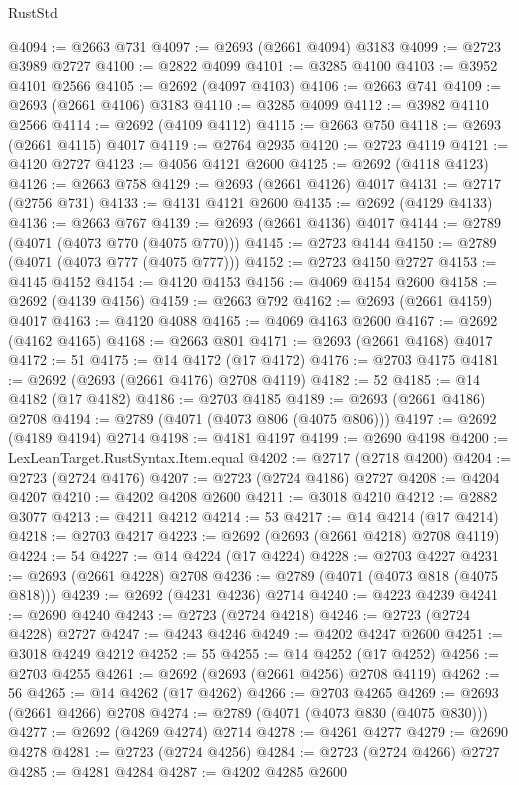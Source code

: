 \begin{lexlean}{RustStd}
\begin{coremodule}
@4094 := @2663 @731
@4097 := @2693 (@2661 @4094) @3183
@4099 := @2723 @3989 @2727
@4100 := @2822 @4099
@4101 := @3285 @4100
@4103 := @3952 @4101 @2566
@4105 := @2692 (@4097 @4103)
@4106 := @2663 @741
@4109 := @2693 (@2661 @4106) @3183
@4110 := @3285 @4099
@4112 := @3982 @4110 @2566
@4114 := @2692 (@4109 @4112)
@4115 := @2663 @750
@4118 := @2693 (@2661 @4115) @4017
@4119 := @2764 @2935
@4120 := @2723 @4119
@4121 := @4120 @2727
@4123 := @4056 @4121 @2600
@4125 := @2692 (@4118 @4123)
@4126 := @2663 @758
@4129 := @2693 (@2661 @4126) @4017
@4131 := @2717 (@2756 @731)
@4133 := @4131 @4121 @2600
@4135 := @2692 (@4129 @4133)
@4136 := @2663 @767
@4139 := @2693 (@2661 @4136) @4017
@4144 := @2789 (@4071 (@4073 @770 (@4075 @770)))
@4145 := @2723 @4144
@4150 := @2789 (@4071 (@4073 @777 (@4075 @777)))
@4152 := @2723 @4150 @2727
@4153 := @4145 @4152
@4154 := @4120 @4153
@4156 := @4069 @4154 @2600
@4158 := @2692 (@4139 @4156)
@4159 := @2663 @792
@4162 := @2693 (@2661 @4159) @4017
@4163 := @4120 @4088
@4165 := @4069 @4163 @2600
@4167 := @2692 (@4162 @4165)
@4168 := @2663 @801
@4171 := @2693 (@2661 @4168) @4017
@4172 := 51
@4175 := @14 @4172 (@17 @4172)
@4176 := @2703 @4175
@4181 := @2692 (@2693 (@2661 @4176) @2708 @4119)
@4182 := 52
@4185 := @14 @4182 (@17 @4182)
@4186 := @2703 @4185
@4189 := @2693 (@2661 @4186) @2708
@4194 := @2789 (@4071 (@4073 @806 (@4075 @806)))
@4197 := @2692 (@4189 @4194) @2714
@4198 := @4181 @4197
@4199 := @2690 @4198
@4200 := LexLeanTarget.RustSyntax.Item.equal
@4202 := @2717 (@2718 @4200)
@4204 := @2723 (@2724 @4176)
@4207 := @2723 (@2724 @4186) @2727
@4208 := @4204 @4207
@4210 := @4202 @4208 @2600
@4211 := @3018 @4210
@4212 := @2882 @3077
@4213 := @4211 @4212
@4214 := 53
@4217 := @14 @4214 (@17 @4214)
@4218 := @2703 @4217
@4223 := @2692 (@2693 (@2661 @4218) @2708 @4119)
@4224 := 54
@4227 := @14 @4224 (@17 @4224)
@4228 := @2703 @4227
@4231 := @2693 (@2661 @4228) @2708
@4236 := @2789 (@4071 (@4073 @818 (@4075 @818)))
@4239 := @2692 (@4231 @4236) @2714
@4240 := @4223 @4239
@4241 := @2690 @4240
@4243 := @2723 (@2724 @4218)
@4246 := @2723 (@2724 @4228) @2727
@4247 := @4243 @4246
@4249 := @4202 @4247 @2600
@4251 := @3018 @4249 @4212
@4252 := 55
@4255 := @14 @4252 (@17 @4252)
@4256 := @2703 @4255
@4261 := @2692 (@2693 (@2661 @4256) @2708 @4119)
@4262 := 56
@4265 := @14 @4262 (@17 @4262)
@4266 := @2703 @4265
@4269 := @2693 (@2661 @4266) @2708
@4274 := @2789 (@4071 (@4073 @830 (@4075 @830)))
@4277 := @2692 (@4269 @4274) @2714
@4278 := @4261 @4277
@4279 := @2690 @4278
@4281 := @2723 (@2724 @4256)
@4284 := @2723 (@2724 @4266) @2727
@4285 := @4281 @4284
@4287 := @4202 @4285 @2600

\end{coremodule}
\end{lexlean}
